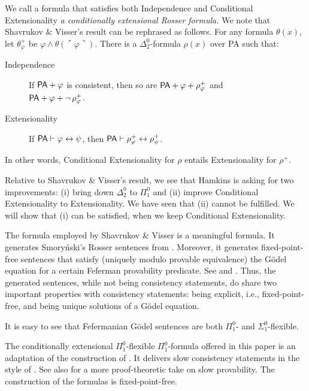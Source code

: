\documentclass{amsart}
\renewcommand{\iff}{\leftrightarrow}
\renewcommand{\phi}{\varphi}
\newcommand{\gnum}[1]{{\ulcorner #1 \urcorner}}
\begin{document}
\noindent
We call a formula that satisfies both Independence and Conditional Extensionality \emph{a
conditionally extensional Rosser formula.} We note that Shavrukov {\&} Visser's result can be rephrased as follows.
For any formula $\theta(x)$, let $\theta^+_\phi$ be $\phi \wedge \theta(\gnum\phi)$.
There is a $\Delta^0_2$-formula $\rho(x)$ over {\sf PA} such that:
\begin{description}
\item[Independence] If ${\sf PA}+ \phi$ is consistent, then so are ${\sf PA}+ \phi + \rho^+_\phi$ and\\
 ${\sf PA}+ \phi+\neg\, \rho^+_\phi$.
\item[Extensionality] If ${\sf PA} \vdash \phi \iff \psi$, then $ {\sf PA} \vdash\rho^+_\phi \iff \rho^+_\psi$.
\end{description}

\noindent In other words, Conditional Extensionality for $\rho$ entails Extensionality for $\rho^+$.

Relative to Shavrukov {\&} Visser's result, we see that Hamkins is asking for two improvements:
(i) bring down $\Delta^0_2$  to $\Pi^0_1$ and (ii) improve Conditional Extensionality to
Extensionality. We have seen that (ii) cannot be fulfilled.  We will show that (i) can be satisfied, when we keep
Conditional Extensionality.
 
 The formula employed by Shavrukov {\&} Visser is a meaningful formula. It generates
 Smory\'nski's  Rosser sentences from \cite{smor:self89}.
 Moreover, it generates  fixed-point-free sentences that satisfy (uniquely modulo provable equivalence) the 
 G\"odel equation for a certain Feferman provability predicate.
 See  \cite{smor:self89} and \cite{shav:smar94}. 
 Thus, the generated sentences, while not being consistency statements, do share two important properties with consistency
 statements: being explicit, i.e., fixed-point-free, and being unique solutions of a G\"odel equation.
 
  It is easy to see that Fefermanian G\"odel sentences are both $\Pi^0_1$- and $\Sigma^0_1$-flexible.
 
 \medskip
 The  conditionally extensional $\Pi^0_1$-flexible $\Pi^0_1$-formula offered in this paper is an adaptation of the construction of 
  \cite{viss:abso21}. It  delivers slow consistency statements in the style of
 \cite{viss:abso21}. See also \cite{frie:slow13} for a more proof-theoretic take on 
 slow provability. The construction of the formulas is fixed-point-free.  
\end{document}
